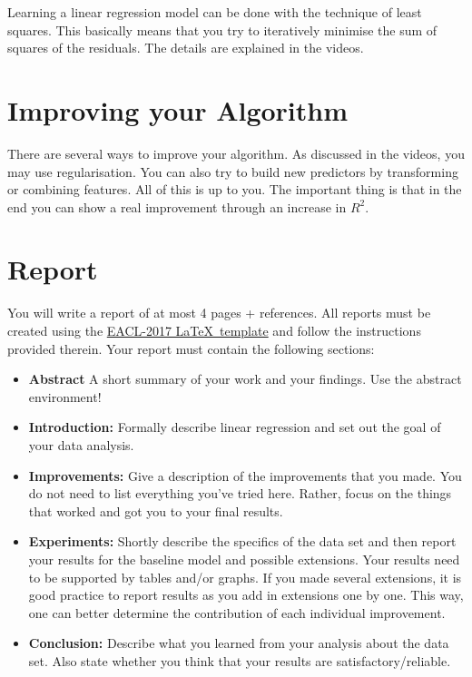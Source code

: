 \documentclass[11pt, leqno, a4paper]{article}
\begin{document}
Learning a linear regression model can be done with the technique of least squares. This basically
means that you try to iteratively minimise the sum of squares of the residuals. The details are
explained in the videos.

\section{Improving your Algorithm}

There are several ways to improve your algorithm. As discussed in the videos, you may use regularisation.
You can also try to build new predictors by transforming or combining features. All of this
is up to you. The important thing is that in the end you can show a real improvement through an
increase in $ R^{2} $.

\section{Report}

You will write a report of at most 4 pages + references. All reports must be created using the 
\href{http://eacl2017.org/images/site/eacl-2017-template.zip}{EACL-2017 \LaTeX \ template} and follow the instructions provided therein. Your report must
contain the following sections:
\begin{itemize}
\item \textbf{Abstract} A short summary of your work and your findings. Use the abstract environment!
\item \textbf{Introduction:} Formally describe linear regression and set out the goal of your data
analysis.
\item \textbf{Improvements:} Give a description of the improvements that you made. You do not
need to list everything you've tried here. Rather, focus on the things that worked and got you to
your final results.
\item \textbf{Experiments:} Shortly describe the specifics of the data set and then report your results for the baseline model
and possible extensions. Your results need to be supported by tables and/or graphs. If you made several
extensions, it is good practice to report results as you add in extensions one by one. This way, one can
better determine the contribution of each individual improvement.
\item \textbf{Conclusion:} Describe what you learned from your analysis about the data set. Also
state whether you think that your results are satisfactory/reliable.
\end{itemize}
\end{document}

